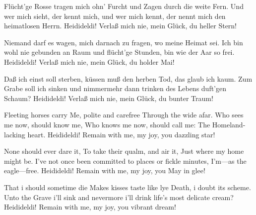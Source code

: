    \vspace*{\fill}
    \begin{poem}
    \begin{stanza}
    Flücht'ge Rosse tragen\verseline
    mich ohn' Furcht und Zagen\verseline
    durch die weite Fern.\verseline
    Und wer mich sieht, der kennt mich,\verseline
    und wer mich kennt, der nennt mich\verseline
    den heimatlosen Herrn.\verseline
    Heidideldi!\verseline
    Verlaß mich nie,\verseline
    mein Glück, du heller Stern!
    \end{stanza}
    \begin{stanza}
    Niemand darf es wagen,\verseline
    mich darnach zu fragen,\verseline
    wo meine Heimat sei.\verseline
    Ich bin wohl nie gebunden\verseline
    an Raum und flücht'ge Stunden,\verseline
    bin wie der Aar so frei.\verseline
    Heidideldi!\verseline
    Verlaß mich nie,\verseline
    mein Glück, du holder Mai!
    \end{stanza}
    \begin{stanza}
    Daß ich einst soll sterben,\verseline
    küssen muß den herben\verseline
    Tod, das glaub ich kaum.\verseline
    Zum Grabe soll ich sinken\verseline
    und nimmermehr dann trinken\verseline
    des Lebens duft'gen Schaum?\verseline
    Heidideldi!\verseline
    Verlaß mich nie,\verseline
    mein Glück, du bunter Traum!
    \end{stanza}
    \end{poem}
    \begin{poem}
    \begin{stanza}
    Fleeting horses carry\verseline
    Me, polite and carefree\verseline
    Through the wide afar.\verseline
    Who sees me now, should know me,\verseline
    Who knows me now, should call me:\verseline
    The Homeland-lacking heart.\verseline
    Heidideldi!\verseline
    Remain with me,\verseline
    my joy, you dazzling star!
    \end{stanza}
    \begin{stanza}
    None should ever dare it,\verseline
    To take their qualm, and air it,\verseline
    Just where my home might be.\verseline
    I've not once been committed\verseline
    to places or fickle minutes,\verseline
    I'm---as the eagle---free.\verseline
    Heidideldi!\verseline
    Remain with me,\verseline
    my joy, you May in glee!
    \end{stanza}
    \begin{stanza}
    That i should sometime die\verseline
    Makes kisses taste like lye\verseline
    Death, i doubt its scheme.\verseline
    Unto the Grave i'll sink\verseline
    and nevermore i'll drink\verseline
    life's most delicate cream?\verseline
    Heidideldi!\verseline
    Remain with me,\verseline
    my joy, you vibrant dream!
    \end{stanza}
    \end{poem}
